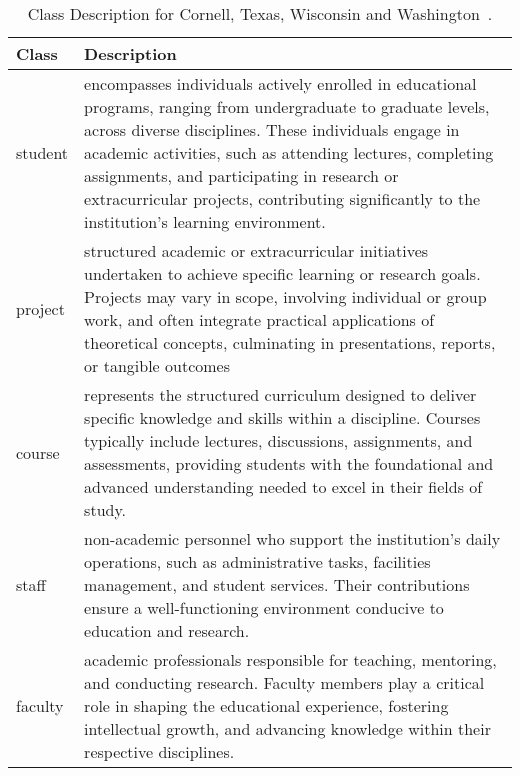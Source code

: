 \begin{table}[h]
\small
\begin{tabular}{|p{1cm}|p{15cm}|}
\toprule
Class & Description \\ \midrule
student & encompasses individuals actively enrolled in educational programs, ranging from undergraduate to graduate levels, across diverse disciplines. These individuals engage in academic activities, such as attending lectures, completing assignments, and participating in research or extracurricular projects, contributing significantly to the institution's learning environment. \\ \midrule
project & structured academic or extracurricular initiatives undertaken to achieve specific learning or research goals. Projects may vary in scope, involving individual or group work, and often integrate practical applications of theoretical concepts, culminating in presentations, reports, or tangible outcomes \\ \midrule
course & represents the structured curriculum designed to deliver specific knowledge and skills within a discipline. Courses typically include lectures, discussions, assignments, and assessments, providing students with the foundational and advanced understanding needed to excel in their fields of study. \\ \midrule
staff & non-academic personnel who support the institution's daily operations, such as administrative tasks, facilities management, and student services. Their contributions ensure a well-functioning environment conducive to education and research. \\ \midrule
faculty & academic professionals responsible for teaching, mentoring, and conducting research. Faculty members play a critical role in shaping the educational experience, fostering intellectual growth, and advancing knowledge within their respective disciplines. \\ \bottomrule
\end{tabular}
\caption{Class Description for Cornell, Texas, Wisconsin and Washington~\cite{craven1998learning}.}
\label{tab:class_description_cornell_texas_wisconsin_washington}
\end{table}